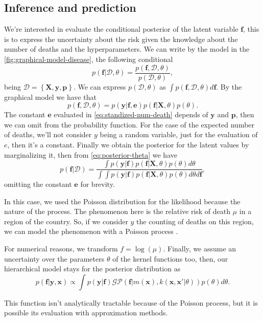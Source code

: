 \subsection{Inference and prediction}

We're interested in evaluate the conditional posterior of the latent variable $\mathbf{f}$, this is to express the uncertainty about the risk given the knowledge about the number of deaths and the hyperparameters. We can write by the model in the \autoref{fig:graphical-model-disease}, the following conditional
%
\begin{equation}
    p(\mathbf{f}|\mathcal{D},\theta) = \frac{p(\mathbf{f},\mathcal{D},\theta)}{p(\mathcal{D},\theta)},
    \label{eq:posterior-theta}
\end{equation}
%
being $\mathcal{D}=\left\{ \mathbf{X},\mathbf{y}, \mathbf{p} \right\}$. We can express $p(\mathcal{D},\theta)$ as $\int p(\mathbf{f},\mathcal{D},\theta)d\mathbf{f}$. By the graphical model we have that
%
\begin{equation}
    p(\mathbf{f},\mathcal{D},\theta) = p(\mathbf{y}|\mathbf{f},\mathbf{e})p(\mathbf{f}|\mathbf{X},\theta)p(\theta).
\end{equation}
%
The constant $\mathbf{e}$ evaluated in \eqref{eq:standized-num-death} depends of $\mathbf{y}$ and $\mathbf{p}$, then we can omit from the probability function. For the case of the expected number of deaths, we'll not consider $y$ being a random variable, just for the evaluation of $e$, then it's a constant. Finally we obtain the posterior for the latent values by marginalizing it, then from \eqref{eq:posterior-theta} we have
{\color{red}
%
\begin{equation}
    p(\mathbf{f}|\mathcal{D})=\frac{\int p(\mathbf{y}|\mathbf{f})p(\mathbf{f}|\mathbf{X},\theta)p(\theta) d\theta}{\int \int p(\mathbf{y}|\mathbf{f})p(\mathbf{f}|\mathbf{X},\theta)p(\theta) d\theta d\mathbf{f}},
\end{equation}
%
}
omitting the constant $\mathbf{e}$ for brevity.
{\color{red}
%

In this case, we used the Poisson distribution for the likelihood because the nature of the process. The phenomenon here is the relative risk of death $\mu$ in a region of the country. So, if we consider $y$ the counting of deaths on this region, we can model the phenomenon with a Poisson process \cite{Vanhatalo2010Vehtari}.

For numerical reasons, we transform $f=\log(\mu)$. Finally, we assume an uncertainty over the parameters $\theta$ of the kernel functions too, then, our hierarchical model stays for the posterior distribution as 
%
\begin{equation}
    p(\mathbf{f}|\mathbf{y},\mathbf{x}) \propto \int p(\mathbf{y}|\mathbf{f})\mathcal{GP}\left(\mathbf{f} | m(\mathbf{x}),k(\mathbf{x},\mathbf{x}'|\theta) \right)p(\theta) d\theta.
\end{equation}

This function isn't analytically tractable because of the Poisson process, but it is possible its evaluation with approximation methods.

}
